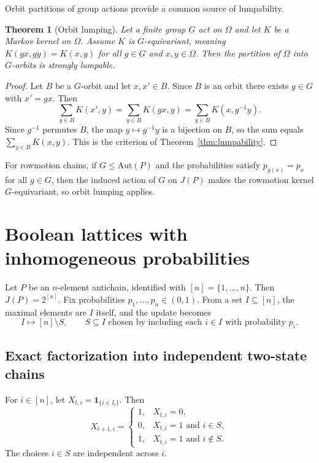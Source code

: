 \documentclass[final,3p,times]{elsarticle}
\newtheorem{theorem}{Theorem}[section]
\theoremstyle{definition}
\newcommand{\one}{\mathbf{1}}
\begin{document}
Orbit partitions of group actions provide a common source of lumpability.

\begin{theorem}[Orbit lumping]\label{thm:orbit_lumping}
Let a finite group $G$ act on $\Omega$ and let $K$ be a Markov kernel on $\Omega$.
Assume $K$ is $G$-equivariant, meaning $K(gx,gy)=K(x,y)$ for all $g\in G$ and $x,y\in\Omega$.
Then the partition of $\Omega$ into $G$-orbits is strongly lumpable.
\end{theorem}

\begin{proof}
Let $B$ be a $G$-orbit and let $x,x'\in B$.
Since $B$ is an orbit there exists $g\in G$ with $x'=gx$.
Then
\[
\sum_{y\in B}K(x',y)=\sum_{y\in B}K(gx,y)=\sum_{y\in B}K(x,g^{-1}y).
\]
Since $g^{-1}$ permutes $B$, the map $y\mapsto g^{-1}y$ is a bijection on $B$, so the sum equals $\sum_{y\in B}K(x,y)$.
This is the criterion of Theorem~\ref{thm:lumpability}.
\end{proof}

For rowmotion chains, if $G\le \mathrm{Aut}(P)$ and the probabilities satisfy $p_{g(x)}=p_x$ for all $g\in G$, then the induced action of $G$ on $J(P)$ makes the rowmotion kernel $G$-equivariant, so orbit lumping applies.

\section{Boolean lattices with inhomogeneous probabilities}

Let $P$ be an $n$-element antichain, identified with $[n]=\{1,\dots,n\}$.
Then $J(P)=2^{[n]}$.
Fix probabilities $p_1,\dots,p_n\in(0,1)$.
From a set $I\subseteq[n]$, the maximal elements are $I$ itself, and the update becomes
\[
I \mapsto [n]\setminus S,
\qquad
S\subseteq I\text{ chosen by including each }i\in I\text{ with probability }p_i.
\]

\subsection{Exact factorization into independent two-state chains}

For $i\in[n]$, let $X_{t,i}=\one_{\{i\in I_t\}}$.
Then
\[
X_{t+1,i} =
\begin{cases}
1, & X_{t,i}=0,\\
0, & X_{t,i}=1\text{ and }i\in S,\\
1, & X_{t,i}=1\text{ and }i\notin S.
\end{cases}
\]
The choices $i\in S$ are independent across $i$.
\end{document}
